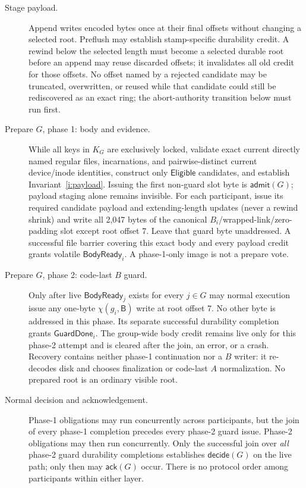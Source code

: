 \documentclass[10pt,twocolumn]{article}
\theoremstyle{remark}
\newcommand{\Prepared}{\mathsf{B}}
\begin{document}
\begin{description}
  \item[Stage payload.] Append writes encoded bytes once at their final offsets without changing a
  selected root. Preflush may establish stamp-specific durability credit. A rewind below the
  selected length must become a selected durable root before an append may reuse discarded offsets;
  it invalidates all old credit for those offsets. No offset named by a rejected candidate may be
  truncated, overwritten, or reused while that candidate could still be rediscovered as an exact
  ring; the abort-authority transition below must run first.

  \item[Prepare $G$, phase 1: body and evidence.] While all keys in $K_G$ are exclusively locked,
  validate exact current directly named regular files, incarnations, and pairwise-distinct current
  device/inode identities, construct only $\mathsf{Eligible}$ candidates, and establish
  Invariant~\ref{i:payload}. Issuing the first non-guard slot byte is $\mathsf{admit}(G)$; payload
  staging alone remains invisible. For each participant, issue its required candidate
  payload and extending-length updates (never a rewind shrink) and write all 2,047 bytes of the canonical
  $B_i$/wrapped-link/zero-padding slot except root offset 7. Leave that guard byte unaddressed. A
  successful file barrier covering this exact body and every payload credit grants volatile
  $\mathsf{BodyReady}_i$. A phase-1-only image is not a prepare vote.

  \item[Prepare $G$, phase 2: code-last $B$ guard.] Only after live
  $\mathsf{BodyReady}_j$ exists for every $j\in G$ may normal execution issue any one-byte
  $\chi(g_i,\Prepared)$ write at root offset 7. No other byte is addressed in this phase. Its
  separate successful durability completion grants $\mathsf{GuardDone}_i$. The group-wide body
  credit remains live only for this phase-2 attempt and is cleared after the join, an error, or a
  crash. Recovery contains neither phase-1 continuation nor a $B$ writer: it
  re-decodes disk and chooses finalization or code-last $A$ normalization. No prepared root is an
  ordinary visible root.

  \item[Normal decision and acknowledgement.] Phase-1 obligations may run concurrently across
  participants, but the join of every phase-1 completion precedes every phase-2 guard issue.
  Phase-2 obligations may then run concurrently. Only the successful join over \emph{all}
  phase-2 guard durability completions establishes $\mathsf{decide}(G)$ on the live path; only then
  may $\mathsf{ack}(G)$ occur. There is no protocol order among participants within either layer.


\end{description}
\end{document}
